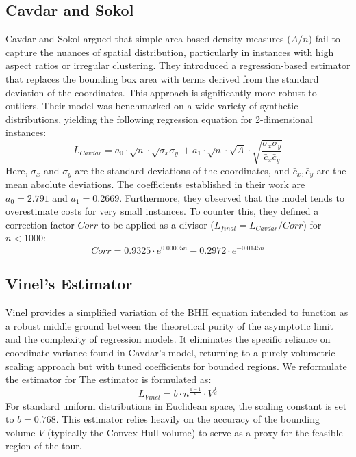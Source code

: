 \documentclass{article}
\begin{document}
\subsection{Cavdar and Sokol}

Cavdar and Sokol \cite{cavdarsokol} argued that simple area-based density measures ($A/n$) fail to capture the nuances of spatial distribution, particularly in instances with high aspect ratios or irregular clustering. They introduced a regression-based estimator that replaces the bounding box area with terms derived from the standard deviation of the coordinates. This approach is significantly more robust to outliers. Their model was benchmarked on a wide variety of synthetic distributions, yielding the following regression equation for 2-dimensional instances:
\begin{equation}
L_{Cavdar} = a_0 \cdot \sqrt{n} \cdot \sqrt{\sigma_x \sigma_y} + a_1 \cdot \sqrt{n} \cdot \sqrt{A} \cdot \sqrt{\frac{\sigma_x \sigma_y}{\bar{c}_x \bar{c}_y}}
\end{equation}
Here, $\sigma_x$ and $\sigma_y$ are the standard deviations of the coordinates, and $\bar{c}_x, \bar{c}_y$ are the mean absolute deviations. The coefficients established in their work are $a_0 = 2.791$ and $a_1 = 0.2669$. Furthermore, they observed that the model tends to overestimate costs for very small instances. To counter this, they defined a correction factor $Corr$ to be applied as a divisor ($L_{final} = L_{Cavdar} / Corr$) for $n < 1000$:
\begin{equation}
Corr = 0.9325 \cdot e^{0.00005n} - 0.2972 \cdot e^{-0.0145n}
\end{equation}

\subsection{Vinel's Estimator}

Vinel provides a simplified variation of the BHH equation intended to function as a robust middle ground between the theoretical purity of the asymptotic limit and the complexity of regression models. It eliminates the specific reliance on coordinate variance found in Cavdar's model, returning to a purely volumetric scaling approach but with tuned coefficients for bounded regions. We reformulate the estimator for The estimator is formulated as:
\begin{equation}
L_{Vinel} = b \cdot n^{\frac{d-1}{d}} \cdot V^{\frac{1}{d}}
\end{equation}
For standard uniform distributions in Euclidean space, the scaling constant is set to $b = 0.768$. This estimator relies heavily on the accuracy of the bounding volume $V$ (typically the Convex Hull volume) to serve as a proxy for the feasible region of the tour.
\end{document}
